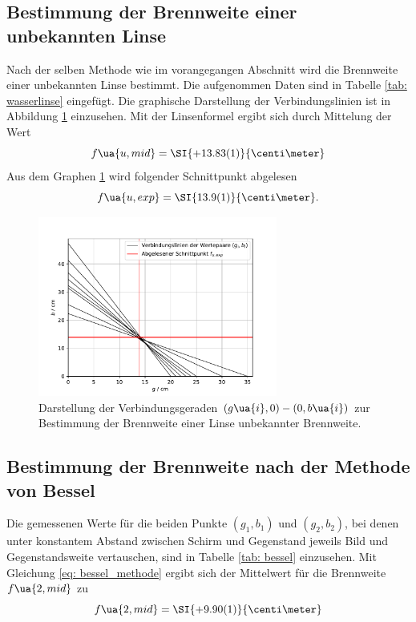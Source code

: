 \subsection{Bestimmung der Brennweite einer unbekannten Linse}
Nach der selben Methode wie im vorangegangen Abschnitt wird die Brennweite einer unbekannten Linse bestimmt.
Die aufgenommen Daten sind in Tabelle \ref{tab: wasserlinse} eingefügt. Die graphische Darstellung der Verbindungslinien ist %
in Abbildung \ref{fig: wasserlinse} einzusehen. Mit der Linsenformel ergibt sich durch Mittelung der Wert
\begin{equation}
  f\ua{u, mid} = \SI{+13.83(1)}{\centi\meter} %
\end{equation}
Aus dem Graphen \ref{fig: wasserlinse} wird folgender Schnittpunkt abgelesen
\begin{equation}
  f\ua{u, exp} = \SI{13.9(1)}{\centi\meter}.
\end{equation}

\begin{figure}
  \centering
  \includegraphics[width = 0.7\textwidth]{../Messdaten/plots/wasserlinse.pdf}
  \caption{Darstellung der Verbindungsgeraden $(g\ua{i}, 0) - (0, b\ua{i})$ zur Bestimmung der Brennweite einer
  Linse unbekannter Brennweite.}
  \label{fig: wasserlinse}
\end{figure}

\subsection{Bestimmung der Brennweite nach der Methode von Bessel}
Die gemessenen Werte für die beiden Punkte $(g_1, b_1)$ und $(g_2, b_2)$, bei denen unter konstantem Abstand
zwischen Schirm und Gegenstand jeweils Bild und Gegenstandsweite
vertauschen, sind in Tabelle \ref{tab: bessel} einzusehen. Mit Gleichung \eqref{eq: bessel_methode} ergibt sich der Mittelwert für
die Brennweite $f\ua{2, mid}$ zu
\begin{equation}
  f\ua{2, mid} = \SI{+9.90(1)}{\centi\meter} %
  \label{eq: f_bessel}
\end{equation}

